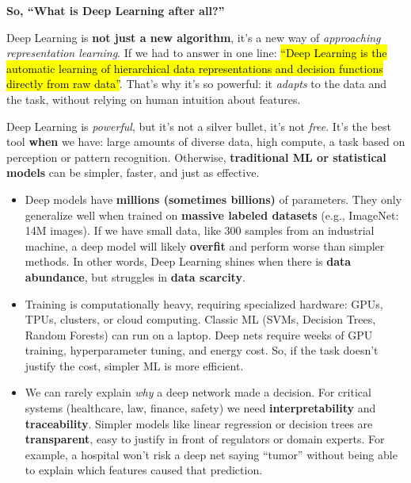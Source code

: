 \highspace
\begin{flushleft}
    \textcolor{Green3}{ \textbf{So, ``What is Deep Learning after all?''}}
\end{flushleft}
Deep Learning is \textbf{not just a new algorithm}, it's a new way of \emph{approaching representation learning}. If we had to answer in one line: \hl{``Deep Learning is the automatic learning of hierarchical data representations and decision functions directly from raw data''}. That's why it's so powerful: it \emph{adapts} to the data and the task, without relying on human intuition about features.

\highspace
\begin{deepeningbox}
    Deep Learning is \emph{powerful}, but it's not a silver bullet, it's not \emph{free}. It's the best tool \textbf{when} we have: large amounts of diverse data, high compute, a task based on perception or pattern recognition. Otherwise, \textbf{traditional ML or statistical models} can be simpler, faster, and just as effective.
    \begin{itemize}
        \item {} Deep models have \textbf{millions (sometimes billions)} of parameters. They only generalize well when trained on \textbf{massive labeled datasets} (e.g., ImageNet: 14M images). If we have small data, like 300 samples from an industrial machine, a deep model will likely \textbf{overfit} and perform worse than simpler methods. In other words, Deep Learning shines when there is \textbf{data abundance}, but struggles in \textbf{data scarcity}.

        \item {} Training is computationally heavy, requiring specialized hardware: GPUs, TPUs, clusters, or cloud computing. Classic ML (SVMs, Decision Trees, Random Forests) can run on a laptop. Deep nets require weeks of GPU training, hyperparameter tuning, and energy cost. So, if the task doesn't justify the cost, simpler ML is more efficient.

        \item {} We can rarely explain \emph{why} a deep network made a decision. For critical systems (healthcare, law, finance, safety) we need \textbf{interpretability} and \textbf{traceability}. Simpler models like linear regression or decision trees are \textbf{transparent}, easy to justify in front of regulators or domain experts. For example, a hospital won't risk a deep net saying ``tumor'' without being able to explain which features caused that prediction.


\end{itemize}
\end{deepeningbox}

